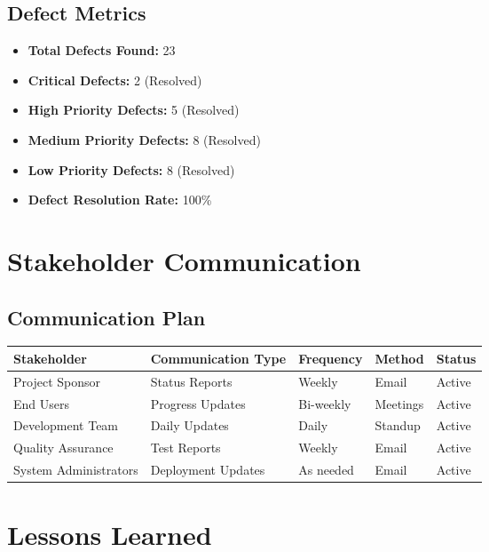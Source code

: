 \documentclass[12pt,a4paper]{article}
\begin{document}
\subsection{Defect Metrics}
\begin{itemize}
    \item \textbf{Total Defects Found:} 23
    \item \textbf{Critical Defects:} 2 (Resolved)
    \item \textbf{High Priority Defects:} 5 (Resolved)
    \item \textbf{Medium Priority Defects:} 8 (Resolved)
    \item \textbf{Low Priority Defects:} 8 (Resolved)
    \item \textbf{Defect Resolution Rate:} 100\%
\end{itemize}

\section{Stakeholder Communication}

\subsection{Communication Plan}
\begin{longtable}{|p{3cm}|p{3cm}|p{3cm}|p{3cm}|p{2cm}|}
\hline
\rowcolor{lightgray}
\textbf{Stakeholder} & \textbf{Communication Type} & \textbf{Frequency} & \textbf{Method} & \textbf{Status} \\
\hline
Project Sponsor & Status Reports & Weekly & Email & \cellcolor{completedgreen}Active \\
\hline
End Users & Progress Updates & Bi-weekly & Meetings & \cellcolor{completedgreen}Active \\
\hline
Development Team & Daily Updates & Daily & Standup & \cellcolor{completedgreen}Active \\
\hline
Quality Assurance & Test Reports & Weekly & Email & \cellcolor{completedgreen}Active \\
\hline
System Administrators & Deployment Updates & As needed & Email & \cellcolor{completedgreen}Active \\
\hline
\end{longtable}

\section{Lessons Learned}
\end{document}
